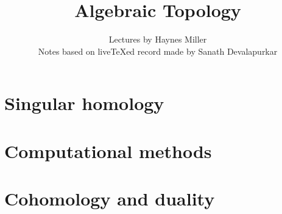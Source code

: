 \documentclass[11pt]{memoir}
\begin{document}
\title{Algebraic Topology}
\author{Lectures by Haynes Miller\\
Notes based on live{\TeX}ed record made by Sanath Devalapurkar

}

\frontmatter

\maketitle

\newpage
\tableofcontents
\newpage

\mainmatter

%

\chapter{Singular homology}














\chapter{Computational methods}













\chapter{Cohomology and duality}
















\nocite{*}


\end{document}
